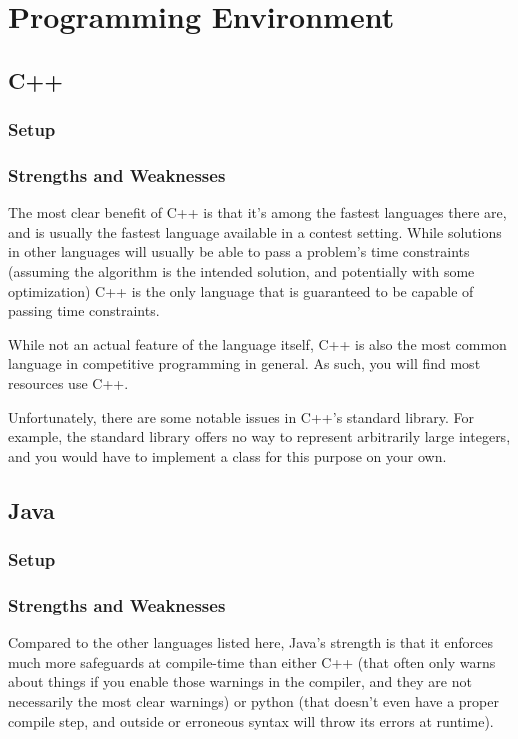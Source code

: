 \section{Programming Environment}



\subsection{C++}

\subsubsection{Setup}

\subsubsection{Strengths and Weaknesses}

The most clear benefit of C++ is that it's among the fastest languages there are, and is usually the fastest language available in a contest setting. While solutions in other languages will usually be able to pass a problem's time constraints (assuming the algorithm is the intended solution, and potentially with some optimization) C++ is the only language that is guaranteed to be capable of passing time constraints.

While not an actual feature of the language itself, C++ is also the most common language in competitive programming in general. As such, you will find most resources use C++.

Unfortunately, there are some notable issues in C++'s standard library. For example, the standard library offers no way to represent arbitrarily large integers, and you would have to implement a class for this purpose on your own.

\subsection{Java}
\subsubsection{Setup}
\subsubsection{Strengths and Weaknesses}

Compared to the other languages listed here, Java's strength is that it enforces much more safeguards at compile-time than either C++ (that often only warns about things if you enable those warnings in the compiler, and they are not necessarily the most clear warnings) or python (that doesn't even have a proper compile step, and outside or erroneous syntax will throw its errors at runtime).

